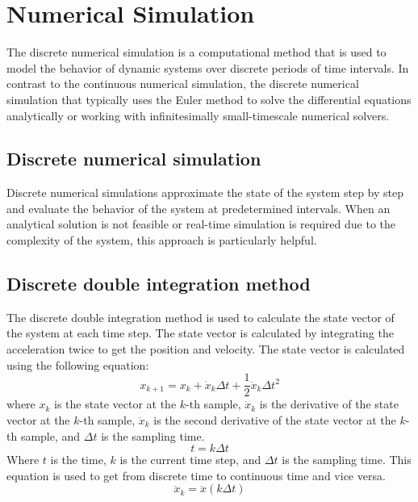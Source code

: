 \section{Numerical Simulation}
The discrete numerical simulation is a computational method that is used to model the behavior of dynamic systems over discrete periods of time intervals. In contrast to the continuous numerical simulation, the discrete numerical simulation that typically uses the Euler method to solve the differential equations analytically or working with infinitesimally small-timescale numerical solvers.
\subsection{Discrete numerical simulation}
Discrete numerical simulations approximate the state of the system step by step and evaluate the behavior of the system at predetermined intervals. When an analytical solution is not feasible or real-time simulation is required due to the complexity of the system, this approach is particularly helpful.
\subsection{Discrete double integration method}
The discrete double integration method is used to calculate the state vector of the system at each time step. The state vector is calculated by integrating the acceleration twice to get the position and velocity. The state vector is calculated using the following equation:
\begin{equation}
	x_{k+1} = x_k + \dot{x}_k \Delta t + \frac{1}{2} \ddot{x}_k \Delta t^2
\end{equation}
where $x_k$ is the state vector at the $k$-th sample, $\dot{x}_k$ is the derivative of the state vector at the $k$-th sample, $\ddot{x}_k$ is the second derivative of the state vector at the $k$-th sample, and $\Delta t$ is the sampling time.
\begin{equation}
    t = k \Delta t
\end{equation}
Where $t$ is the time, $k$ is the current time step, and $\Delta t$ is the sampling time. This equation is used to get from discrete time to continuous time and vice versa.
\begin{equation}
    \ddot{x}_k = \ddot{x}(k \Delta t)
\end{equation}

